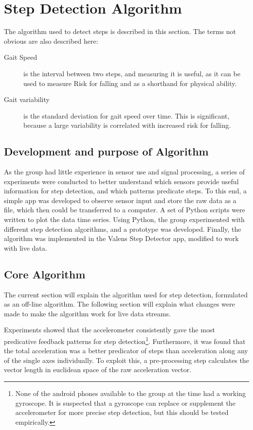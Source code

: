 \section{Step Detection Algorithm}
The algorithm used to detect steps is described in this section. The terms not obvious are also described here:
\begin{description}
\item[Gait Speed] is the interval between two steps, and measuring it is useful, as it can be used to measure Risk for falling and as a shorthand for physical ability.
\item[Gait variability] is the standard deviation for gait speed over time. This is significant, because a large variability is correlated with increased risk for falling.
\end{description}
\subsection{Development and purpose of Algorithm}
As the group had little experience in sensor use and signal processing, a series of experiments were conducted to better understand which sensors provide useful information for step detection, and which patterns predicate steps. To this end, a simple app was developed to observe sensor input and store the raw data as a file, which then could be transferred to a computer. A set of Python scripts were written to plot  the data time series. Using Python, the group experimented with different step detection algorithms, and a prototype was developed. Finally, the algorithm was implemented in the Valens Step Detector app, modified to work with live data.

\subsection{Core Algorithm}\label{def:coreAlgorithm}
The current section will explain the algorithm used for step detection, formulated as an off-line algorithm. The following section will explain what changes were made to make the algorithm work for live data streams.

Experiments showed that the accelerometer consistently gave the most predicative feedback patterns for step detection\footnote{None of the android phones available to the group at the time had a working gyroscope. It is suspected that a gyroscope can replace or supplement the accelerometer for more precise step detection, but this should be tested empirically.}. Furthermore, it was found that the total acceleration was a better predicator of steps than acceleration along any of the single axes individually. To exploit this, a pre-processing step calculates the vector length in euclidean space of the raw acceleration vector.


